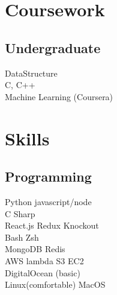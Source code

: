 \documentclass[]{deedy-resume-openfont}
\begin{document}
\begin{minipage}[t]{0.33\textwidth}

\section{Coursework}

\subsection{Undergraduate}
DataStructure \\
C, C++ \\
Machine Learning (Coursera) \\
\sectionsep


\section{Skills}
\subsection{Programming}
\textbullet{} Python \textbullet{} javascript/node \\
\textbullet{} C Sharp \\
\textbullet{} React.js \textbullet{} Redux \textbullet{} Knockout \\
\textbullet{} Bash \textbullet{} Zsh \\
\textbullet{} MongoDB \textbullet{} Redis \\
\textbullet{} AWS lambda \textbullet{} S3 \textbullet{} EC2 \\
\textbullet{} DigitalOcean (basic) \\
\textbullet{} Linux(comfortable) \textbullet{} MacOS \\
\sectionsep


\end{minipage}
\end{document}
